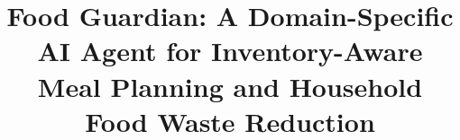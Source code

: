 \documentclass[conference]{IEEEtran}
\begin{document}
\title{Food Guardian: A Domain-Specific AI Agent for Inventory-Aware Meal Planning and Household Food Waste Reduction}

\maketitle












\end{document}
